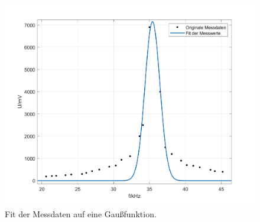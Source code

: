 \begin{figure}[H]
  \centering
  \includegraphics[width=12cm]{content/fit.png}
  \caption{Fit der Messdaten auf eine Gaußfunktion.}
\end{figure}

